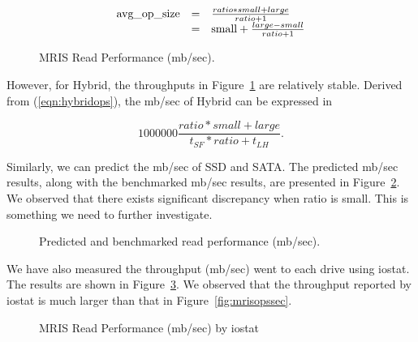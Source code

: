 \begin{equation}
\label{eqn:opsize}
\begin{array}{r@{\quad=\quad}l}
  \mbox{avg\_op\_size} & \frac{ratio * small + large}{ratio + 1} \\
   & \mbox{small} + \frac{large - small}{ratio + 1} 
\end{array}
\end{equation}

\begin{figure}[t]
\begin{centering}
\caption{MRIS Read Performance (mb/sec).}
\label{fig:mrismbsec}
\end{centering}
\end{figure}

However, for Hybrid, the throughputs in Figure~\ref{fig:mrismbsec} are
relatively stable. Derived from (\ref{eqn:hybridops}), the mb/sec of
Hybrid can be expressed in

\begin{equation}
\label{eqn:hybridthput}
    1000000 \frac{ratio * small + large}{t_{SF} * ratio + t_{LH}} .
\end{equation}

Similarly, we can predict the mb/sec of SSD and SATA. The predicted
mb/sec results, along with the benchmarked mb/sec results, are
presented in Figure~\ref{fig:thputpred}. We observed that there exists
significant discrepancy when ratio is small. This is something we need
to further investigate.

\begin{figure}[t]
\begin{centering}
\caption{Predicted and benchmarked read performance (mb/sec).}
\label{fig:thputpred}
\end{centering}
\end{figure}


We have also measured the throughput (mb/sec) went to each drive using
iostat. The results are shown in Figure~\ref{fig:mrisiostat}. We
observed that the throughput reported by iostat is much larger than
that in Figure~\ref{fig:mrisopssec}. 

\begin{figure}[t]
\begin{centering}
\caption{MRIS Read Performance (mb/sec) by iostat}
\label{fig:mrisiostat}
\end{centering}
\end{figure}

